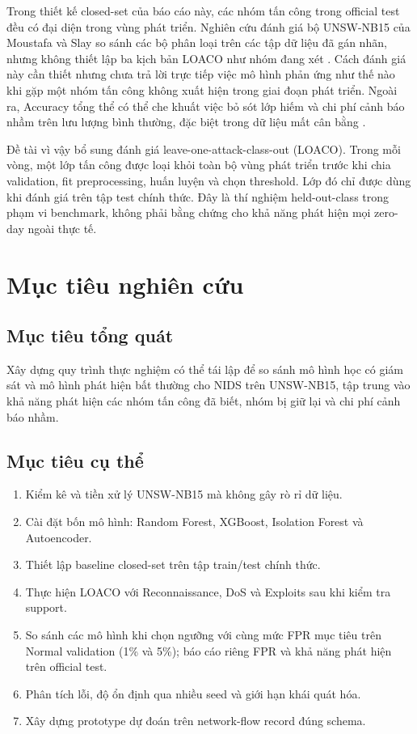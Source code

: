 \documentclass[12pt,a4paper,oneside]{report}
\newcommand{\methodname}{leave-one-attack-class-out}
\begin{document}
Trong thiết kế closed-set của báo cáo này, các nhóm tấn công trong official test đều có đại diện trong vùng phát triển. Nghiên cứu đánh giá bộ UNSW-NB15 của Moustafa và Slay so sánh các bộ phân loại trên các tập dữ liệu đã gán nhãn, nhưng không thiết lập ba kịch bản LOACO như nhóm đang xét \cite{moustafa2016}. Cách đánh giá này cần thiết nhưng chưa trả lời trực tiếp việc mô hình phản ứng như thế nào khi gặp một nhóm tấn công không xuất hiện trong giai đoạn phát triển. Ngoài ra, Accuracy tổng thể có thể che khuất việc bỏ sót lớp hiếm và chi phí cảnh báo nhầm trên lưu lượng bình thường, đặc biệt trong dữ liệu mất cân bằng \cite{saito2015}.

Đề tài vì vậy bổ sung đánh giá \methodname{} (LOACO). Trong mỗi vòng, một lớp tấn công được loại khỏi toàn bộ vùng phát triển trước khi chia validation, fit preprocessing, huấn luyện và chọn threshold. Lớp đó chỉ được dùng khi đánh giá trên tập test chính thức. Đây là thí nghiệm held-out-class trong phạm vi benchmark, không phải bằng chứng cho khả năng phát hiện mọi zero-day ngoài thực tế.

\section{Mục tiêu nghiên cứu}

\subsection{Mục tiêu tổng quát}

Xây dựng quy trình thực nghiệm có thể tái lập để so sánh mô hình học có giám sát và mô hình phát hiện bất thường cho NIDS trên UNSW-NB15, tập trung vào khả năng phát hiện các nhóm tấn công đã biết, nhóm bị giữ lại và chi phí cảnh báo nhầm.

\subsection{Mục tiêu cụ thể}

\begin{enumerate}[label=\arabic*.,leftmargin=1.1cm,itemsep=0.2em]
  \item Kiểm kê và tiền xử lý UNSW-NB15 mà không gây rò rỉ dữ liệu.
  \item Cài đặt bốn mô hình: Random Forest, XGBoost, Isolation Forest và Autoencoder.
  \item Thiết lập baseline closed-set trên tập train/test chính thức.
  \item Thực hiện LOACO với Reconnaissance, DoS và Exploits sau khi kiểm tra support.
  \item So sánh các mô hình khi chọn ngưỡng với cùng mức FPR mục tiêu trên Normal validation (1\% và 5\%); báo cáo riêng FPR và khả năng phát hiện trên official test.
  \item Phân tích lỗi, độ ổn định qua nhiều seed và giới hạn khái quát hóa.
  \item Xây dựng prototype dự đoán trên network-flow record đúng schema.
\end{enumerate}
\end{document}

